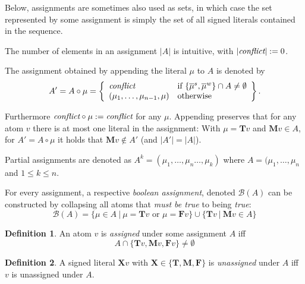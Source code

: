 \documentclass{vutinfth} %
\theoremstyle{example}
\theoremstyle{definition}
\newtheorem{definition}{Definition}[section]
\theoremstyle{theorem}
\theoremstyle{lemma}
\theoremstyle{corollary}
\newtheorem*{remark}{Remark}
\newcommand{\negstrong}[1]{\overline{#1}^s}
\newcommand{\negweak}[1]{\overline{#1}^w}
\newcommand{\bass}{\mathcal{B}}
\newcommand{\ass}{A}
\newcommand{\bT}{\mathbf{T}}
\newcommand{\bM}{\mathbf{M}}
\newcommand{\bF}{\mathbf{F}}
\newcommand{\bX}{\mathbf{X}}
\newcommand{\sgl}{\mu}
\newcommand{\thrice}{{\{\bT, \bM, \bF \}}}
\begin{document}
Below, assignments are sometimes also used as sets, in which case the set represented by some assignment is simply the set of all signed literals contained in the sequence.

The number of elements in an assignment $|\ass|$ is intuitive, with $|\emph{conflict}| := 0$.

The assignment obtained by appending the literal $\sgl$ to $\ass$ is denoted by $$\ass' = \ass \circ \sgl = \left\{\begin{array}{ll}
        
        \emph{conflict} & \text{if } \{ \negstrong{\sgl}, \negweak{\sgl} \} \cap \ass \not = \emptyset \\
        (\sgl_1, \ldots, \sgl_{n-1}, \sgl) & \text{otherwise} \\
        \end{array}\right\}.$$

Furthermore $\emph{conflict} \circ \sgl := \emph{conflict}$ for any $\sgl$. Appending preserves that for any atom $v$ there is at most one literal in the assignment: With $\sgl = \bT v$ and $\bM v \in \ass$, for $\ass' = \ass \circ \sgl$ it holds that $\bM v \not \in \ass'$ (and $|\ass'| = |\ass|$).

Partial assignments are denoted as $A^{k} = (\sgl_1, \ldots, \sgl_n \ldots, \sgl_k)$ where $A = (\sgl_1, \ldots, \sgl_n$ and $1 \leq k \leq n$.

For every assignment, a respective \emph{boolean assignment}, denoted $\bass(\ass)$ can be constructed by collapsing all atoms that \emph{must be true} to being \emph{true}:$$\bass(\ass) = \{ \sgl \in \ass \ | \ \sgl = \bT v \textrm{ or } \sgl = \bF v \} \cup \{ \bT v \ | \ \bM v \in \ass \}$$

\begin{definition}
An atom $v$ is \emph{assigned} under some assignment $\ass$ iff $$\ass \cap \{\bT v, \bM v, \bF v \} \not = \emptyset$$
\end{definition}


\begin{definition}
A signed literal $\bX v$ with $\bX \in \thrice$ is \emph{unassigned} under $\ass$ iff $v$ is unassigned under $\ass$.
\end{definition}
\end{document}
